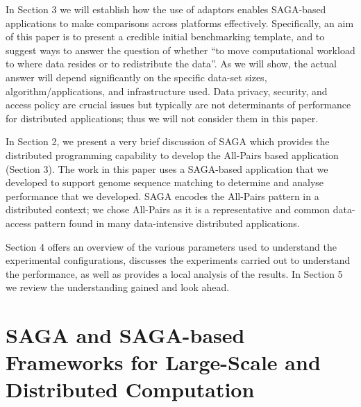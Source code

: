 \documentclass{rspublic}
\begin{document}
In Section 3 we will establish how the use of adaptors enables
SAGA-based applications to make comparisons across platforms
effectively. Specifically, an aim of this paper is to present a
credible initial benchmarking template, and to suggest ways to answer
the question of whether ``to move computational workload to where data
resides or to redistribute the data''. As we will show, the actual
answer will depend significantly on the specific data-set sizes,
algorithm/applications, and infrastructure used. Data privacy,
security, and access policy are crucial issues but typically are not
determinants of performance for distributed applications; thus we will
not consider them in this paper.

In Section 2, we present a very brief discussion of SAGA which
provides the distributed programming capability to develop the
All-Pairs based application (Section 3). The work in this paper uses a
SAGA-based application that we developed to support genome sequence
matching to determine and analyse performance that we developed. SAGA
encodes the All-Pairs pattern in a distributed context; we chose
All-Pairs as it is a representative and common data-access pattern
found in many data-intensive distributed applications.

Section 4 offers an overview of the various parameters used to
understand the experimental configurations, discusses the experiments
carried out to understand the performance, as well as provides a local
analysis of the results. In Section 5 we review the understanding
gained and look ahead.



\vspace{-0.5cm}

\section{SAGA and SAGA-based Frameworks for Large-Scale and
 Distributed Computation}\label{Sec:SAGA}
\end{document}
